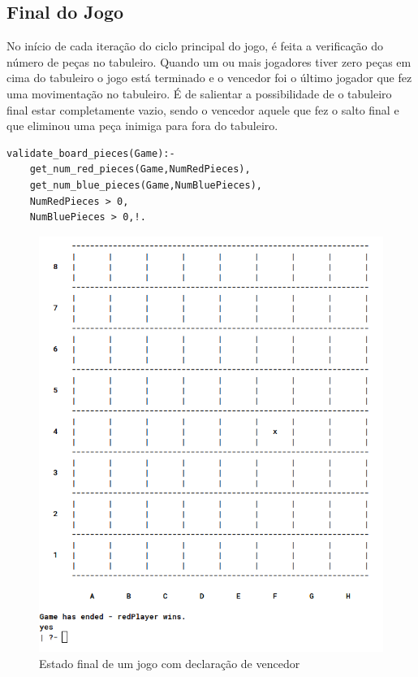 \documentclass[a4paper]{article}
\begin{document}
\subsection{Final do Jogo}
No início de cada iteração do ciclo principal do jogo, é feita a verificação do número de peças no tabuleiro. Quando um ou mais jogadores tiver zero peças em cima do tabuleiro o jogo está terminado e o vencedor foi o último jogador que fez uma movimentação no tabuleiro. É de salientar a possibilidade de o tabuleiro final estar completamente vazio, sendo o vencedor aquele que fez o salto final e que eliminou uma peça inimiga para fora do tabuleiro.

\begin{lstlisting}[style=customprolog]
validate_board_pieces(Game):-
    get_num_red_pieces(Game,NumRedPieces),
    get_num_blue_pieces(Game,NumBluePieces),
    NumRedPieces > 0,
    NumBluePieces > 0,!.
\end{lstlisting}

\begin{figure}[H]
    \center
    \includegraphics[scale=0.5]{resources/game-ending.png}
    \caption{Estado final de um jogo com declaração de vencedor}
    \label{fig:game-ending.png}
\end{figure}
\end{document}

